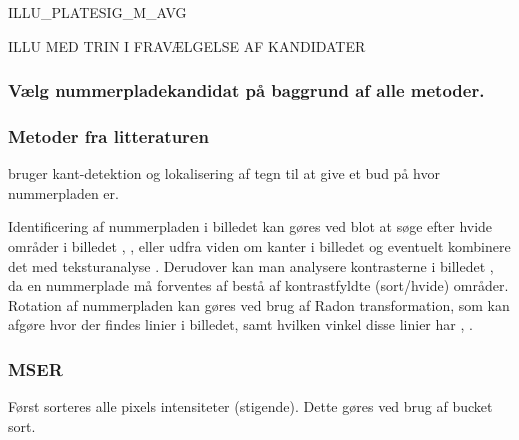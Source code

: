 ILLU\_PLATESIG\_M\_AVG



ILLU MED TRIN I FRAVÆLGELSE AF KANDIDATER





\subsubsection{Vælg nummerpladekandidat på baggrund af alle metoder.}


\subsubsection{Metoder fra litteraturen}
\cite{parker} bruger kant-detektion og lokalisering af tegn til at give et bud på hvor nummerpladen er.

Identificering af nummerpladen i billedet kan gøres ved blot at søge efter hvide områder i billedet \cite{ron}, \cite{nijhuis}, eller udfra viden om kanter i billedet \cite{shapiro} og eventuelt kombinere det med teksturanalyse \cite{parker}. Derudover kan man analysere kontrasterne i billedet \cite{kwas}, da en nummerplade må forventes af bestå af kontrastfyldte (sort/hvide) områder. Rotation af nummerpladen kan gøres ved brug af Radon transformation, som kan afgøre hvor der findes linier i billedet, samt hvilken vinkel disse linier har \cite{ron}, \cite{shapiro}. 

\subsubsection*{MSER}
Først sorteres alle pixels intensiteter (stigende). Dette gøres ved brug af bucket sort.


